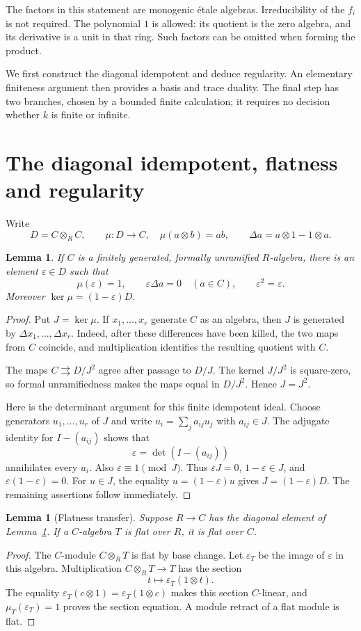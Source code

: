 \documentclass[11pt]{article}
\newtheorem{lemma}[theorem]{Lemma}
\theoremstyle{definition}
\theoremstyle{remark}
\newcommand{\eps}{\varepsilon}
\newcommand{\Del}{\Delta}
\begin{document}
The factors in this statement are monogenic \'etale algebras.
Irreducibility of the $f_i$ is not required. The polynomial $1$ is
allowed: its quotient is the zero algebra, and its derivative is a
unit in that ring. Such factors can be omitted when forming the product.

We first construct the diagonal idempotent and deduce regularity.
An elementary finiteness argument then provides a basis and trace
duality. The final step has two branches, chosen by a bounded finite
calculation; it requires no decision whether $k$ is finite or infinite.

\section{The diagonal idempotent, flatness and regularity}

Write
\[
 D=C\otimes_R C,\qquad
 \mu:D\longrightarrow C,\quad \mu(a\otimes b)=ab,
 \qquad \Del a=a\otimes1-1\otimes a.
\]

\begin{lemma}\label{lem:diagonal}
If $C$ is a finitely generated, formally unramified $R$-algebra,
there is an element $\eps\in D$ such that
\[
 \mu(\eps)=1,\qquad \eps\Del a=0\quad(a\in C),
 \qquad \eps^2=\eps.
\]
Moreover $\ker\mu=(1-\eps)D$.
\end{lemma}
\begin{proof}
Put $J=\ker\mu$. If $x_1,\ldots,x_r$ generate $C$ as an algebra,
then $J$ is generated by $\Del x_1,\ldots,\Del x_r$. Indeed, after
these differences have been killed, the two maps from $C$ coincide,
and multiplication identifies the resulting quotient with $C$.

The maps $C\rightrightarrows D/J^2$ agree after passage to $D/J$.
The kernel $J/J^2$ is square-zero, so formal unramifiedness makes
the maps equal in $D/J^2$. Hence $J=J^2$.

Here is the determinant argument for this finite idempotent ideal.
Choose generators $u_1,\ldots,u_r$ of $J$ and write
$u_i=\sum_j a_{ij}u_j$ with $a_{ij}\in J$. The adjugate identity for
$I-(a_{ij})$ shows that
\[
 \eps=\det(I-(a_{ij}))
\]
annihilates every $u_i$. Also $\eps\equiv1\pmod J$.
Thus $\eps J=0$, $1-\eps\in J$, and $\eps(1-\eps)=0$.
For $u\in J$, the equality $u=(1-\eps)u$ gives
$J=(1-\eps)D$. The remaining assertions follow immediately.
\end{proof}

\begin{lemma}[Flatness transfer]\label{lem:flatness}
Suppose $R\to C$ has the diagonal element of Lemma~\ref{lem:diagonal}.
If a $C$-algebra $T$ is flat over $R$, it is flat over $C$.
\end{lemma}
\begin{proof}
The $C$-module $C\otimes_R T$ is flat by base change.
Let $\eps_T$ be the image of $\eps$ in this algebra. Multiplication
$C\otimes_R T\to T$ has the section
\[
 t\longmapsto\eps_T(1\otimes t).
\]
The equality $\eps_T(c\otimes1)=\eps_T(1\otimes c)$ makes this
section $C$-linear, and $\mu_T(\eps_T)=1$ proves the section equation.
A module retract of a flat module is flat.
\end{proof}
\end{document}
